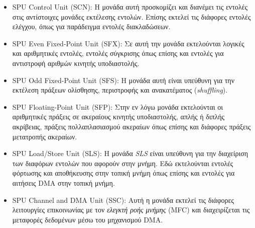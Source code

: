 \begin{itemize}

\item{SPU Control Unit (SCN): Η μονάδα αυτή προσκομίζει και διανέμει τις εντολές στις αντίστοιχες μονάδες εκτέλεσης εντολών. Επίσης εκτελεί τις διάφορες εντολές ελέγχου, όπως για παράδειγμα εντολές διακλαδώσεων.}

\item{SPU Even Fixed-Point Unit (SFX): Σε αυτή την μονάδα εκτελούνται λογικές και αριθμητικές εντολές, εντολές σύγκρισης όπως επίσης και εντολές για αντιστροφή αριθμών κινητής υποδιαστολής.}

\item{SPU Odd Fixed-Point Unit (SFS): Η μονάδα αυτή είναι υπεύθυνη για την εκτέλεση πράξεων ολίσθησης, περιστροφής και ανακατέματος (\textsl{shuffling}).}

\item{SPU Floating-Point Unit (SFP): Στην εν λόγω μονάδα εκτελούνται οι αριθμητικές πράξεις σε ακεραίους κινητής υποδιαστολής, απλής ή διπλής ακρίβειας, πράξεις πολλαπλασιασμού ακεραίων όπως επίσης και διάφορες πράξεις μετατροπής ακεραίων.}

\item{SPU Load/Store Unit (SLS): Η μονάδα \textsl{SLS} είναι υπεύθυνη για την διαχείριση των διαφόρων εντολών που αφορούν στην μνήμη. Εδώ εκτελούνται εντολές φόρτωσης και αποθήκευσης στην τοπική μνήμη όπως επίσης και εντολές για αιτήσεις \ac{DMA} στην τοπική μνήμη.}

\item{SPU Channel and DMA Unit (SSC): Αυτή η μονάδα εκτελεί τις διάφορες λειτουργίες επικοινωνίας με τον \textsl{ελεγκτή ροής μνήμης} (\ac{MFC}) και διαχειρίζεται τις μεταφορές δεδομένων μέσω του μηχανισμού \ac{DMA}.}

\end{itemize}
